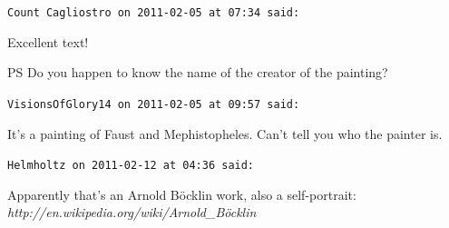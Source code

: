 \begin{footnotesize}
\begin{sffamily}
\texttt{Count Cagliostro on 2011-02-05 at 07:34 said:}

Excellent text!

PS Do you happen to know the name of the creator of the painting?

\hfill

\texttt{VisionsOfGlory14 on 2011-02-05 at 09:57 said:}

It's a painting of Faust and Mephistopheles. Can't tell you who the painter is.

\hfill

\texttt{Helmholtz on 2011-02-12 at 04:36 said:}

Apparently that's an Arnold Böcklin work, also a self-portrait:
\textit{http://en.wikipedia.org/wiki/Arnold\_Böcklin}

\hfill

\end{sffamily}
\end{footnotesize}

